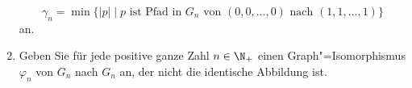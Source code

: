 \documentclass[12pt]{article}
\begin{document}
\begin{aufgabe}[2 + 2 + 2 + 2 + 1 + 2  = 11]
\begin{enumerate}
          \begin{equation*}
            \gamma_n = \min\{ |p| \mid \text{$p$ ist Pfad in $G_n$ von $(0,0,\dotsc,0)$ nach $(1,1,\dotsc,1)$} \}
          \end{equation*}
          an.
    \item Geben Sie für jede positive ganze Zahl $n \in \N_+$ einen Graph"=Isomorphismus $\varphi_n$ von $G_n$ nach $G_n$ an, der nicht die identische Abbildung ist. %

  \end{enumerate}
\end{aufgabe}
\end{document}
